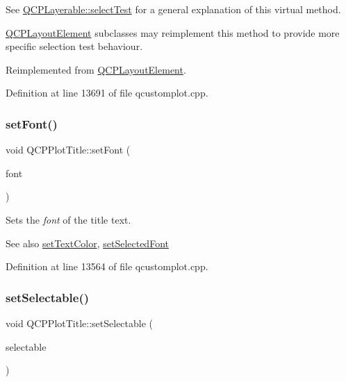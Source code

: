 See \hyperlink{class_q_c_p_layerable_a04db8351fefd44cfdb77958e75c6288e}{Q\+C\+P\+Layerable\+::select\+Test} for a general explanation of this virtual method.

\hyperlink{class_q_c_p_layout_element}{Q\+C\+P\+Layout\+Element} subclasses may reimplement this method to provide more specific selection test behaviour. 

Reimplemented from \hyperlink{class_q_c_p_layout_element_a0b96ae0d7bcfa6e38188fcb1e73e143f}{Q\+C\+P\+Layout\+Element}.



Definition at line 13691 of file qcustomplot.\+cpp.

\mbox{\label{class_q_c_p_plot_title_a199fc7170802ea65006c371875349e37}} 
\subsubsection{\texorpdfstring{set\+Font()}{setFont()}}
{\footnotesize\ttfamily void Q\+C\+P\+Plot\+Title\+::set\+Font (\begin{DoxyParamCaption}\item[{const Q\+Font \&}]{font }\end{DoxyParamCaption})}

Sets the {\itshape font} of the title text.

\begin{DoxySeeAlso}{See also}
\hyperlink{class_q_c_p_plot_title_a71273e3a0ca6b4c151591b37b9e5ce33}{set\+Text\+Color}, \hyperlink{class_q_c_p_plot_title_a5245980ead999ceed51dbe702d0e3131}{set\+Selected\+Font} 
\end{DoxySeeAlso}


Definition at line 13564 of file qcustomplot.\+cpp.

\mbox{\label{class_q_c_p_plot_title_a8866b07b9fa14877d4cefbf38406c5dd}} 
\subsubsection{\texorpdfstring{set\+Selectable()}{setSelectable()}}
{\footnotesize\ttfamily void Q\+C\+P\+Plot\+Title\+::set\+Selectable (\begin{DoxyParamCaption}\item[{bool}]{selectable }\end{DoxyParamCaption})}

